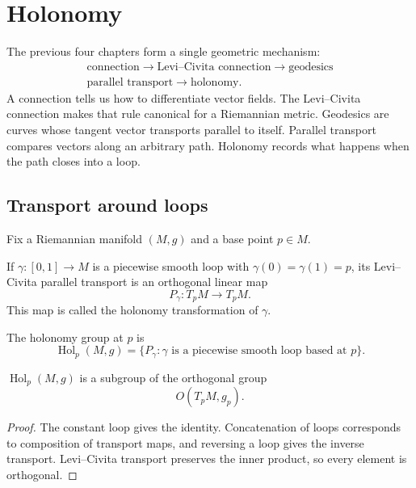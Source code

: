 \chapter{Holonomy}
\label{ch:vii25-holonomy}

The previous four chapters form a single geometric mechanism:
\[
\boxed{\begin{gathered}
\text{connection}
\longrightarrow \text{Levi--Civita connection}
\longrightarrow \text{geodesics}\\
\text{parallel transport}
\longrightarrow \text{holonomy}.
\end{gathered}}
\]
A connection tells us how to differentiate vector fields.  The Levi--Civita
connection makes that rule canonical for a Riemannian metric.  Geodesics are curves
whose tangent vector transports parallel to itself.  Parallel transport compares
vectors along an arbitrary path.  Holonomy records what happens when the path
closes into a loop.

\section{Transport around loops}

Fix a Riemannian manifold \((M,g)\) and a base point \(p\in M\).

\begin{definition}\label{def:vii25-hol-transform}
If \(\gamma:[0,1]\to M\) is a piecewise smooth loop with
\(\gamma(0)=\gamma(1)=p\), its Levi--Civita parallel transport is an orthogonal
linear map
\[
P_\gamma:T_pM\to T_pM.
\]
This map is called the holonomy transformation of \(\gamma\).
\end{definition}

\begin{definition}\label{def:vii25-hol-group}
The holonomy group at \(p\) is
\[
\operatorname{Hol}_p(M,g)
=
\{P_\gamma:\gamma\text{ is a piecewise smooth loop based at }p\}.
\]
\end{definition}

\begin{theorem}\label{thm:vii25-group}
\(\operatorname{Hol}_p(M,g)\) is a subgroup of the orthogonal group
\[
O(T_pM,g_p).
\]
\end{theorem}

\begin{proof}
The constant loop gives the identity.  Concatenation of loops corresponds to
composition of transport maps, and reversing a loop gives the inverse transport.
Levi--Civita transport preserves the inner product, so every element is orthogonal.
\end{proof}

